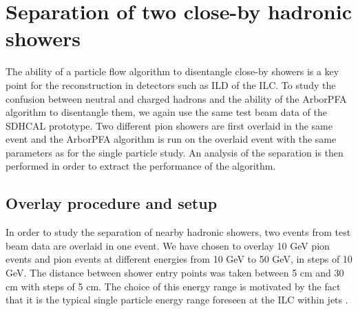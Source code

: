 \documentclass[cits]{JINST}
\begin{document}
\section{Separation of two close-by hadronic showers}

The ability of a particle flow algorithm to disentangle close-by showers is a key point for the reconstruction in detectors such as ILD of the ILC. To study the confusion between neutral and charged hadrons and the ability of the ArborPFA algorithm to disentangle them, we again use the same test beam data of the SDHCAL prototype. Two different pion showers are first overlaid in the same event and the ArborPFA algorithm is run on the overlaid event with the same parameters as for the single particle study. An analysis of the separation is then performed in order to extract the performance of the algorithm.

\subsection{Overlay procedure and setup}

In order to study the separation of nearby hadronic showers, two events from test beam data are overlaid in one event. We have chosen to overlay 10 GeV pion events and pion events at different energies from 10 GeV to 50 GeV, in steps of 10 GeV. The distance between shower entry points was taken between 5 cm and 30 cm with steps of 5 cm. The choice of this energy range is motivated by the fact that it is the typical single particle energy range foreseen at the ILC within jets \cite{hadron-jets}.
\end{document}
